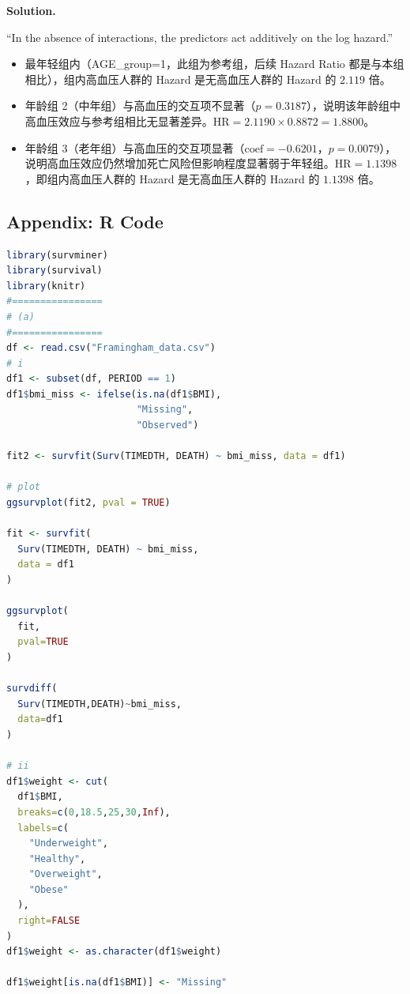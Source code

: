 \begin{enumerate}
\begin{enumerate}[label=(\alph*)]
\begin{enumerate}[label=\roman*.]
\textbf{Solution.}

``In the absence of interactions, the predictors act additively on the log hazard.''

\begin{itemize}
\item 最年轻组内（AGE\_group=1，此组为参考组，后续 Hazard Ratio 都是与本组相比），组内高血压人群的 Hazard 是无高血压人群的 Hazard 的 $2.119$ 倍。
\item 年龄组 2（中年组）与高血压的交互项不显著（$p=0.3187$），说明该年龄组中高血压效应与参考组相比无显著差异。$\text{HR} = 2.1190 \times 0.8872 = 1.8800$。
\item 年龄组 3（老年组）与高血压的交互项显著（$\text{coef}=-0.6201$，$p=0.0079$），说明高血压效应仍然增加死亡风险但影响程度显著弱于年轻组。$\text{HR} = 1.1398$，即组内高血压人群的 Hazard 是无高血压人群的 Hazard 的 $1.1398$ 倍。
\end{itemize}
\end{enumerate}
\end{enumerate}

\newpage
\subsection*{Appendix: R Code}

\begin{lstlisting}[language=R, caption={HW8 R Code}]
library(survminer)
library(survival)
library(knitr)
#================
# (a)
#================
df <- read.csv("Framingham_data.csv")
# i
df1 <- subset(df, PERIOD == 1)
df1$bmi_miss <- ifelse(is.na(df1$BMI),
                       "Missing",
                       "Observed")

fit2 <- survfit(Surv(TIMEDTH, DEATH) ~ bmi_miss, data = df1)

# plot
ggsurvplot(fit2, pval = TRUE)

fit <- survfit(
  Surv(TIMEDTH, DEATH) ~ bmi_miss,
  data = df1
)

ggsurvplot(
  fit,
  pval=TRUE
)

survdiff(
  Surv(TIMEDTH,DEATH)~bmi_miss,
  data=df1
)

# ii
df1$weight <- cut(
  df1$BMI,
  breaks=c(0,18.5,25,30,Inf),
  labels=c(
    "Underweight",
    "Healthy",
    "Overweight",
    "Obese"
  ),
  right=FALSE
)
df1$weight <- as.character(df1$weight)

df1$weight[is.na(df1$BMI)] <- "Missing"


\end{lstlisting}
\end{enumerate}
